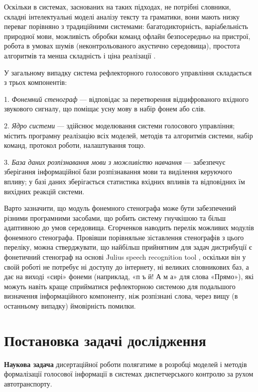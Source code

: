 Оскільки в системах, заснованих на таких підходах, не потрібні словники, складні інтелектуальні моделі аналізу тексту та граматики, вони мають низку переваг порівняно з традиційними системами: багатодикторність, варіабельність природної мови, можливість обробки команд офлайн безпосередньо на пристрої, робота в умовах шумів (неконтрольованого акустично середовища), простота алгоритмів та менша складність і ціна реалізації \cite{Teslia_2013}.

У загальному випадку система рефлекторного голосового управління складається з трьох компонентів:

1. \textit{Фонемний стенограф} --- відповідає за перетворення відцифрованого вхідного звукового сигналу, що поміщає усну мову в набір фонем або слів.

2. \textit{Ядро системи} --- здійснює моделювання системи голосового управління; містить програмну реалізацію всіх моделей, методів та алгоритмів системи, набір команд, протокол роботи, налаштування тощо.

3. \textit{База даних розпізнавання мови з можливістю навчання} --- забезпечує зберігання інформаційної бази розпізнавання мови та виділення керуючого впливу; у базі даних зберігається статистика вхідних впливів та відповідних їм вихідних реакцій системи.

Варто зазначити, що модуль фонемного стенографа може бути забезпечений різними програмними засобами, що робить систему гнучкішою та більш адаптивною до умов середовища. Єгорченков \cite{Egorchenkov_2016} наводить перелік можливих модулів фонемного стенографа. Провівши порівняльне зіставлення стенографів з цього переліку, можна стверджувати, що найбільш прийнятним для задач дистрибуції є фонетичний стенограф на основі Julius speech recognition tool \cite{Pylypenko_2009}, оскільки він у своїй роботі не потребує ні доступу до інтернету, ні великих словникових баз, а дає на виході «сирі» фонеми (наприклад, «п ъ й! А м а» для слова «Прямо»), які можуть навіть краще сприйматися рефлекторною системою для подальшого визначення інформаційного компоненту, ніж розпізнані слова, через вищу (в останньому випадку) ймовірність помилки.

\section{Постановка задачі дослідження} \label{sect1_6}

\textbf{Наукова задача} дисертаційної роботи полягатиме в розробці моделей і методів формалізації голосової інформації в системах диспетчерського контролю за рухом автотранспорту.


